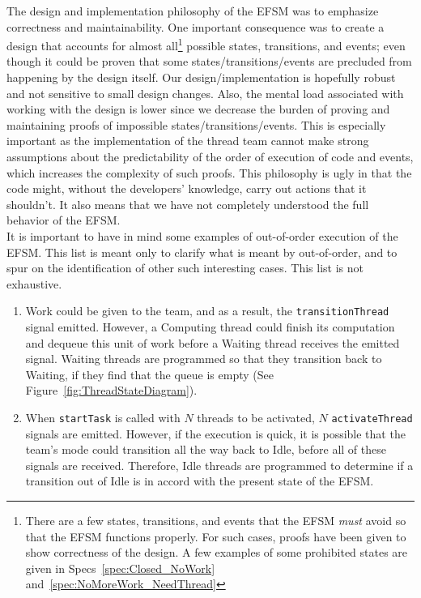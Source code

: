 \documentclass{article}
\begin{document}
The design and implementation philosophy of the EFSM was to emphasize
correctness and maintainability.  One important consequence was to create a
design that accounts for almost all\footnote{There are a few states,
transitions, and events that the EFSM \textit{must} avoid so that the EFSM
functions properly.  For such cases, proofs have been given to show correctness
of the design.  A few examples of some prohibited states are given in
Specs~\ref{spec:Closed_NoWork} and~\ref{spec:NoMoreWork_NeedThread}} possible
states, transitions, and events; even though it could be proven that some
states/transitions/events are precluded from happening by the design itself.
Our design/implementation is hopefully robust and not sensitive to
small design changes.  Also, the mental load associated with working with the
design is lower since we decrease the burden of proving and maintaining
proofs of impossible states/transitions/events.  This is especially important as
the implementation of the thread team cannot make strong assumptions about the
predictability of the order of execution of code and events, which increases the
complexity of such proofs.  This philosophy is ugly in that the code might,
without the developers' knowledge, carry out actions that it shouldn't.  It also
means that we have not completely understood the full behavior of the EFSM.\\

It is important to have in mind some examples of out-of-order execution of the
EFSM.  This list is meant only to clarify what is meant by out-of-order, and to
spur on the identification of other such interesting cases.  This list is
not exhaustive.
\begin{enumerate}
\item{Work could be given to the team, and as a result, the
\texttt{transitionThread} signal emitted.  However, a Computing thread could
finish its computation and dequeue this unit of work before a Waiting thread
receives the emitted signal.  Waiting threads are programmed so that
they transition back to Waiting, if they find that the queue is empty (See
Figure~\ref{fig:ThreadStateDiagram}).}
\item{When \texttt{startTask} is called with $N$ threads to be activated, $N$
\texttt{activateThread} signals are emitted.  However, if the \job execution is
quick, it is possible that the team's mode could transition all the way back to
Idle, before all of these signals are received.  Therefore, Idle threads are
programmed to determine if a transition out of Idle is in accord with the
present state of the EFSM.}
\end{enumerate}
\end{document}
